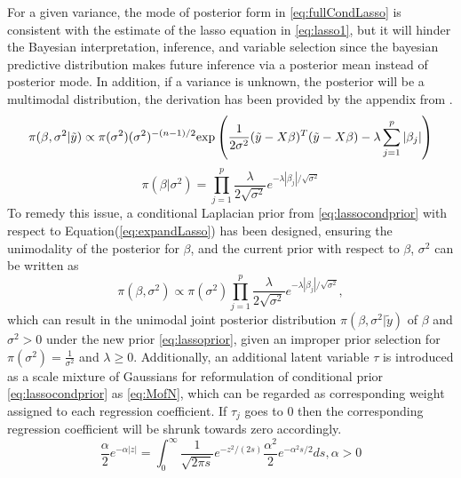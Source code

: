 For a given variance, the mode of posterior form in \autoref{eq:fullCondLasso} is consistent with the estimate of the lasso equation in \autoref{eq:lasso1}, but it will hinder the Bayesian interpretation, inference, and variable selection since the bayesian predictive distribution makes future inference via a posterior mean instead of posterior mode.
In addition, if a variance is unknown, the posterior will be a multimodal distribution, the derivation has been provided by the appendix from \cite{park_casella_2008}.
\begin{equation}
	\label{eq:fullCondLasso}
	\pi(\beta,\sigma^2|\tilde{y}) \propto \pi(\sigma^2)(\sigma^2)^{-(n-1)/2}\textnormal{exp}\left(\frac{1}{2\sigma^2}(\tilde{y}-X\beta)^T(\tilde{y}-X\beta)-\lambda\sum_{j=1}^p|\beta_j|\right)
\end{equation}
\begin{equation}
	\label{eq:lassocondprior}
	\pi(\beta |\sigma^2) = \prod_{j=1}^p \frac{\lambda}{2\sqrt{\sigma^2}} e^{-\lambda|\beta_j|/\sqrt{\sigma^2}}
\end{equation}
To remedy this issue, a conditional Laplacian prior from \ref{eq:lassocondprior} with respect to Equation(\ref{eq:expandLasso}) has been designed, ensuring the unimodality of the posterior for $\beta$, and the current prior with respect to $\beta$, $\sigma^2$  can be written as
\begin{equation}
	\label{eq:lassoprior}
	\pi(\beta,\sigma^2) \propto \pi(\sigma^2) \prod_{j=1}^p \frac{\lambda}{2\sqrt{\sigma^2}} e^{-\lambda|\beta_j|/\sqrt{\sigma^2}},
\end{equation}
which can result in the unimodal joint posterior distribution $\pi(\beta,\sigma^2|\tilde{y})$ of $\beta$ and $\sigma^2 > 0$ under the new prior \ref{eq:lassoprior}, given an improper prior selection for $\pi(\sigma^2) = \frac{1}{\sigma^2}$ and $\lambda \geq 0$.
Additionally, an additional latent variable $\tau$ is introduced as a scale mixture of Gaussians for reformulation of conditional prior \ref{eq:lassocondprior} as \ref{eq:MofN}, which can be regarded as corresponding weight assigned to each regression coefficient. If $\tau_j$ goes to 0 then the corresponding regression coefficient will be shrunk towards zero accordingly.
\begin{equation}
	\label{eq:MofN}
	\frac{\alpha}{2}e^{-\alpha|z|} = \int_{0}^{\infty} \frac{1}{\sqrt{2\pi s}}e^{-z^2/(2s)} \frac{\alpha^2}{2}e^{-\alpha^2s/2}ds, \alpha > 0
\end{equation}

